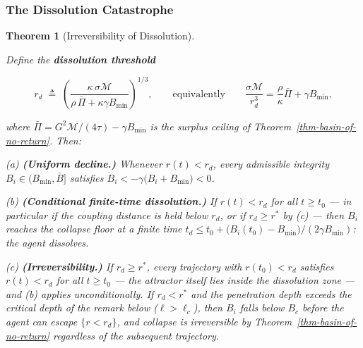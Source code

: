 \documentclass[11pt]{article}
\theoremstyle{plain}
\newtheorem{theorem}{Theorem}
\theoremstyle{definition}
\theoremstyle{remark}
\let\origsubsubsection\subsubsection
\renewcommand{\subsubsection}{\needspace{4\baselineskip}\origsubsubsection}
\begin{document}
\subsubsection{The Dissolution
Catastrophe}\label{the-dissolution-catastrophe}

\begin{theorem}[Irreversibility of Dissolution]
\label{thm-irreversibility-dissolution}

Define the \textbf{dissolution threshold}

$$r_d \;\triangleq\; \left(\frac{\kappa\, \sigma \mathcal{M}}{\rho\, \bar{\Pi} + \kappa \gamma B_{\min}}\right)^{1/3}, \qquad \text{equivalently} \qquad \frac{\sigma\mathcal{M}}{r_d^3} = \frac{\rho}{\kappa}\bar{\Pi} + \gamma B_{\min},$$

where $\bar{\Pi} = G^2\mathcal{M}/(4\tau) - \gamma B_{\min}$ is the surplus ceiling of Theorem~\ref{thm-basin-of-no-return}. Then:

(a) \textbf{(Uniform decline.)} Whenever $r(t) < r_d$, every admissible integrity $B_i \in (B_{\min}, \bar{B}]$ satisfies $\dot{B}_i < -\gamma\bigl(B_i + B_{\min}\bigr) < 0$.

(b) \textbf{(Conditional finite-time dissolution.)} If $r(t) < r_d$ for all $t \geq t_0$ — in particular if the coupling distance is held below $r_d$, or if $r_d \geq r^*$ by (c) — then $B_i$ reaches the collapse floor at a finite time $t_d \leq t_0 + \bigl(B_i(t_0) - B_{\min}\bigr)/(2\gamma B_{\min})$: the agent dissolves.

(c) \textbf{(Irreversibility.)} If $r_d \geq r^*$, every trajectory with $r(t_0) < r_d$ satisfies $r(t) < r_d$ for all $t \geq t_0$ — the attractor itself lies inside the dissolution zone — and (b) applies unconditionally. If $r_d < r^*$ and the penetration depth exceeds the critical depth of the remark below ($\ell > \ell_c$), then $B_i$ falls below $B_c$ before the agent can escape $\{r < r_d\}$, and collapse is irreversible by Theorem~\ref{thm-basin-of-no-return} regardless of the subsequent trajectory.
\end{theorem}
\end{document}
